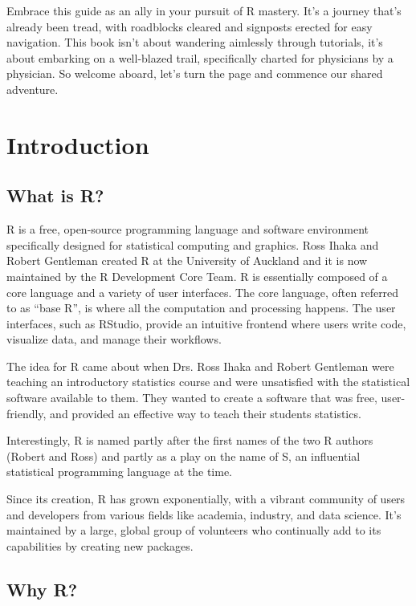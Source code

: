 \documentclass[
  letterpaper,
  DIV=11,
  numbers=noendperiod]{scrreprt}
\begin{document}
Embrace this guide as an ally in your pursuit of R mastery. It's a
journey that's already been tread, with roadblocks cleared and signposts
erected for easy navigation. This book isn't about wandering aimlessly
through tutorials, it's about embarking on a well-blazed trail,
specifically charted for physicians by a physician. So welcome aboard,
let's turn the page and commence our shared adventure.


\hypertarget{introduction}{%
\chapter{Introduction}\label{introduction}}

\hypertarget{what-is-r}{%
\section{What is R?}\label{what-is-r}}

R is a free, open-source programming language and software environment
specifically designed for statistical computing and graphics. Ross Ihaka
and Robert Gentleman created R at the University of Auckland and it is
now maintained by the R Development Core Team. R is essentially composed
of a core language and a variety of user interfaces. The core language,
often referred to as ``base R'', is where all the computation and
processing happens. The user interfaces, such as RStudio, provide an
intuitive frontend where users write code, visualize data, and manage
their workflows.

The idea for R came about when Drs. Ross Ihaka and Robert Gentleman were
teaching an introductory statistics course and were unsatisfied with the
statistical software available to them. They wanted to create a software
that was free, user-friendly, and provided an effective way to teach
their students statistics.

Interestingly, R is named partly after the first names of the two R
authors (Robert and Ross) and partly as a play on the name of S, an
influential statistical programming language at the time.

Since its creation, R has grown exponentially, with a vibrant community
of users and developers from various fields like academia, industry, and
data science. It's maintained by a large, global group of volunteers who
continually add to its capabilities by creating new packages.

\hypertarget{why-r}{%
\section{Why R?}\label{why-r}}
\end{document}
